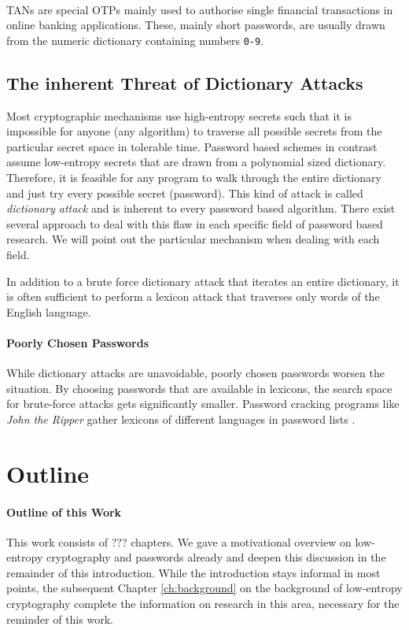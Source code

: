 \paragraph{}
\acp{TAN} are special \acp{OTP} mainly used to authorise single financial transactions in online banking applications.
These, mainly short passwords, are usually drawn from the numeric dictionary containing numbers \texttt{0-9}.

\subsection{The inherent Threat of Dictionary Attacks}
Most cryptographic mechanisms use high-entropy secrets such that it is impossible for anyone (any algorithm) to traverse all possible secrets from the particular secret space in tolerable time.
Password based schemes in contrast assume low-entropy secrets that are drawn from a polynomial sized dictionary.
Therefore, it is feasible for any program to walk through the entire dictionary and just try every possible secret (password).
This kind of attack is called \emph{dictionary attack} and is inherent to every password based algorithm.
There exist several approach to deal with this flaw in each specific field of password based research.
We will point out the particular mechanism when dealing with each field.

In addition to a brute force dictionary attack that iterates an entire dictionary, it is often sufficient to perform a lexicon attack that traverses only \eg words of the English language.

\paragraph{Poorly Chosen Passwords}
While dictionary attacks are unavoidable, poorly chosen passwords worsen the situation.
By choosing passwords that are available in lexicons, the search space for brute-force attacks gets significantly smaller.
Password cracking programs like \emph{John the Ripper} \cite{JohnTheRipper} gather lexicons of different languages in password lists \cite{JohnTheRipperWordlist}.

\section{Outline}

\paragraph{Outline of this Work}
This work consists of ??? chapters.
We gave a motivational overview on low-entropy cryptography and passwords already and deepen this discussion in the remainder of this introduction.
While the introduction stays informal in most points, the subsequent Chapter \ref{ch:background} on the background of low-entropy cryptography complete the information on research in this area, necessary for the reminder of this work.

